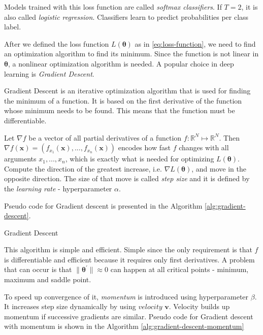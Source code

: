 Models trained with this loss function are called \textit{softmax classifiers}. If $T = 2$, it is also called \textit{logistic regression}. Classifiers learn to predict probabilities per class label.

After we defined the loss function $L(\pmb \theta)$  as in \ref{eq:loss-function}, we need to find an optimization algorithm to find its minimum. Since the function is not linear in $\pmb \theta$, a nonlinear optimization algorithm is needed. A popular choice in deep learning is \textit{Gradient Descent}.

Gradient Descent is an iterative optimization algorithm that is used for finding the minimum of a function. It is based on the first derivative of the function whose minimum needs to be found. This means that the function must be differentiable. 

Let $\nabla f$ be a vector of all partial derivatives of a function $f: \mathbb{R}^N \mapsto \mathbb{R}^N$. Then $\nabla f(\pmb x) = (f_{x_1}(\pmb x), ..., f_{x_n}(\pmb x))$  encodes how fast $f$ changes with all arguments $x_1, ..., x_n$, which is exactly what is needed for optimizing $L(\pmb \theta)$. Compute the direction of the greatest increase, i.e. $\nabla L(\pmb \theta)$, and move in the opposite direction. The size of that move is called \textit{step size} and it is defined by the \textit{learning rate} - hyperparameter $\alpha$.  

Pseudo code for Gradient descent is presented in the Algorithm \ref{alg:gradient-descent}.

\begin{algorithm}[htb]
\caption{Gradient Descent}
\label{alg:gradient-descent}


\end{algorithm}

This algorithm is simple and efficient. Simple since the only requirement is that $f$ is differentiable and efficient because it requires only first derivatives. A problem that can occur is that $\| \pmb \theta^{'}\|  \approx 0$ can happen at all critical points - minimum, maximum and saddle point.

To speed up convergence of it, \textit{momentum} is introduced using hyperparameter $\beta$. It increases step size dynamically by using $velocity$ $\pmb v$. Velocity builds up momentum if successive gradients are similar. Pseudo code for Gradient descent with momentum is shown in the Algorithm \ref{alg:gradient-descent-momentum}

